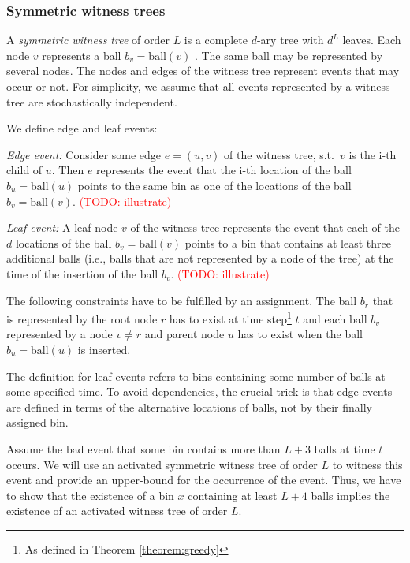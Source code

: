 \documentclass[a4paper,12pt]{article}
\newcommand\todo[1]{\textcolor{red}{(TODO: #1)}}
\begin{document}
\subsubsection{Symmetric witness trees}
\label{sec:analysis:definitionSymWT}
A \emph{symmetric witness tree} of order $L$ is a complete $d$-ary tree with $d^{L}$ leaves. Each node $v$ represents a ball $b_v = \mathrm{ball}(v)$ . The same ball may be represented by several nodes. The nodes and edges of the witness tree represent events that may occur or not. For simplicity, we assume that all events represented by a witness tree are stochastically independent.  

We define edge and leaf events:
\begin{compactitem}
\item \emph{Edge event:} Consider some edge $e = (u,v)$ of the witness tree, s.t.~$v$ is the i-th child of $u$. Then $e$ represents the event that the i-th location of the ball $b_u = \mathrm{ball}(u)$ points to the same bin as one of the locations of the ball $b_v = \mathrm{ball}(v)$. 
\todo{illustrate}
\item \emph{Leaf event:} A leaf node $v$ of the witness tree represents the event that each of the $d$ locations of the ball $b_v = \mathrm{ball}(v)$ points to a bin that contains at least three additional balls (i.e., balls that are not represented by a node of the tree) at the time of the insertion of the ball $b_v$.
\todo{illustrate}
\end{compactitem}

The following constraints have to be fulfilled by an assignment. The ball $b_r$ that is represented by the root node $r$ has to exist at time step\footnote{As defined in Theorem \ref{theorem:greedy}} $t$ and each ball $b_v$ represented by a node $v \neq r$ and parent node $u$ has to exist when the ball $b_u = \mathrm{ball}(u)$ is inserted.

The definition for leaf events refers to bins containing some number of balls at some specified time. To avoid dependencies, the crucial trick is that edge events are defined in terms of the alternative locations of balls, not by their finally assigned bin. 

Assume the bad event that some bin contains more than $L+3$ balls at time $t$ occurs. We will use an activated symmetric witness tree of order $L$ to witness this event and provide an upper-bound for the occurrence of the event. Thus, we have to show that the existence of a bin $x$ containing at least $L+4$ balls implies the existence of an activated witness tree of order $L$. 
\end{document}
